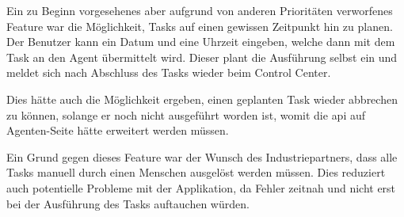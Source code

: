 Ein zu Beginn vorgesehenes aber aufgrund von anderen Prioritäten verworfenes Feature war die Möglichkeit, Tasks auf einen gewissen Zeitpunkt hin zu planen. Der Benutzer kann ein Datum und eine Uhrzeit eingeben, welche dann mit dem Task an den Agent übermittelt wird. Dieser plant die Ausführung selbst ein und meldet sich nach Abschluss des Tasks wieder beim Control Center.

Dies hätte auch die Möglichkeit ergeben, einen geplanten Task wieder abbrechen zu können, solange er noch nicht ausgeführt worden ist, womit die \gls{api} auf Agenten-Seite hätte erweitert werden müssen.

Ein Grund gegen dieses Feature war der Wunsch des Industriepartners, dass alle Tasks manuell durch einen Menschen ausgelöst werden müssen. Dies reduziert auch potentielle Probleme mit der Applikation, da Fehler zeitnah und nicht erst bei der Ausführung des Tasks auftauchen würden.
